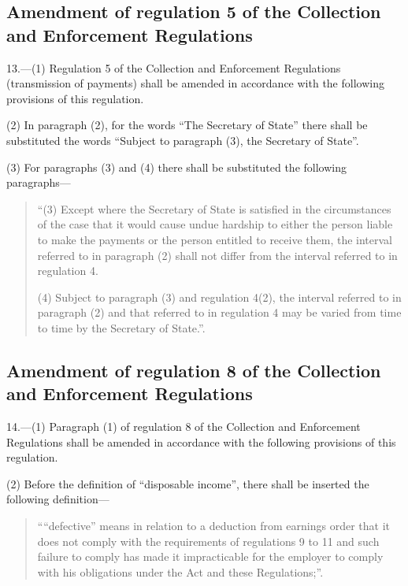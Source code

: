 \documentclass[a4paper]{article}
\begin{document}
\subsection[13. Amendment of regulation 5 of the Collection and Enforcement Regulations]{Amendment of regulation 5 of the Collection and Enforcement Regulations}

13.—(1) Regulation 5 of the Collection and Enforcement Regulations (transmission of payments) shall be amended in accordance with the following provisions of this regulation.

(2) In paragraph (2), for the words “The Secretary of State” there shall be substituted the words “Subject to paragraph (3), the Secretary of State”.

(3) For paragraphs (3) and (4) there shall be substituted the following paragraphs—
\begin{quotation}
“(3) Except where the Secretary of State is satisfied in the circumstances of the case that it would cause undue hardship to either the person liable to make the payments or the person entitled to receive them, the interval referred to in paragraph (2) shall not differ from the interval referred to in regulation 4.

(4) Subject to paragraph (3) and regulation 4(2), the interval referred to in paragraph (2) and that referred to in regulation 4 may be varied from time to time by the Secretary of State.”.
\end{quotation}

\subsection[14. Amendment of regulation 8 of the Collection and Enforcement Regulations]{Amendment of regulation 8 of the Collection and Enforcement Regulations}

14.—(1) Paragraph (1) of regulation 8 of the Collection and Enforcement Regulations shall be amended in accordance with the following provisions of this regulation.

(2) Before the definition of “disposable income”, there shall be inserted the following definition—
\begin{quotation}
““defective” means in relation to a deduction from earnings order that it does not comply with the requirements of regulations 9 to 11 and such failure to comply has made it impracticable for the employer to comply with his obligations under the Act and these Regulations;”.
\end{quotation}
\end{document}
